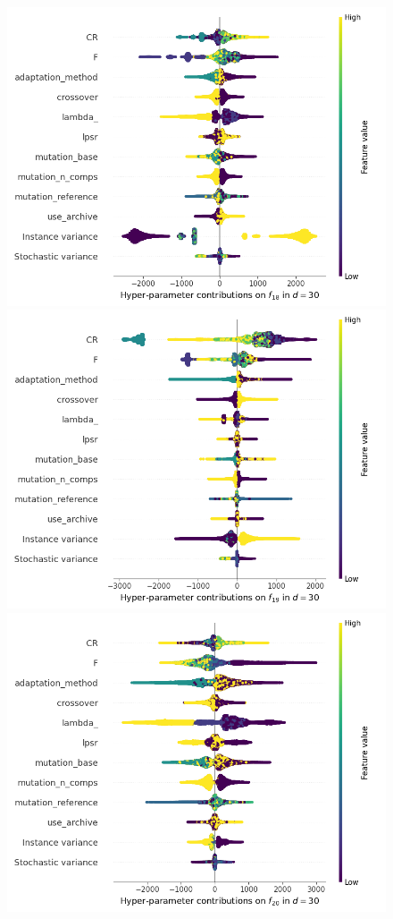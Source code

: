 \begin{figure}[t]
	\includegraphics[height=0.15\textheight,trim=60mm 0mm 30mm 0mm,clip]{de_img_new/img_summary_f18_d30.png}
	\includegraphics[height=0.15\textheight,trim=60mm 0mm 30mm 0mm,clip]{de_img_new/img_summary_f19_d30.png}
	\includegraphics[height=0.15\textheight,trim=60mm 0mm 0mm 0mm,clip]{de_img_new/img_summary_f20_d30.png}

\end{figure}
